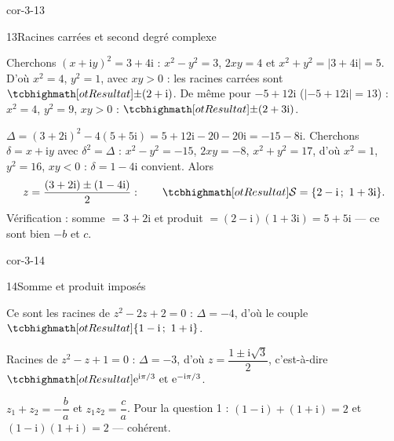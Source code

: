 \begin{blocLivre}{cor-3-13}
\begin{corrige}{13}{Racines carrées et second degré complexe}
\begin{questions}
  \item Cherchons $(x+\mathrm{i}y)^{2}=3+4\mathrm{i}$ :
    $x^{2}-y^{2}=3$, $2xy=4$ et $x^{2}+y^{2}=|3+4\mathrm{i}|=5$. D'où
    $x^{2}=4$, $y^{2}=1$, avec $xy>0$ :
    les racines carrées sont $\res{\pm(2+\mathrm{i})}$.
    De même pour $-5+12\mathrm{i}$ ($|{-5+12\mathrm{i}}|=13$) :
    $x^{2}=4$, $y^{2}=9$, $xy>0$ : $\res{\pm(2+3\mathrm{i})}$.
  \item $\Delta=(3+2\mathrm{i})^{2}-4(5+5\mathrm{i})=5+12\mathrm{i}-20-20\mathrm{i}
    =-15-8\mathrm{i}$. Cherchons $\delta=x+\mathrm{i}y$ avec $\delta^{2}=\Delta$ :
    $x^{2}-y^{2}=-15$, $2xy=-8$, $x^{2}+y^{2}=17$, d'où $x^{2}=1$, $y^{2}=16$,
    $xy<0$ : $\delta=1-4\mathrm{i}$ convient. Alors
    \[
      z=\frac{(3+2\mathrm{i})\pm(1-4\mathrm{i})}{2} :
      \qquad\res{\mathcal{S}=\ens{2-\mathrm{i}\,;\ 1+3\mathrm{i}}}.
    \]
    Vérification : somme $=3+2\mathrm{i}$ et produit
    $=(2-\mathrm{i})(1+3\mathrm{i})=5+5\mathrm{i}$ — ce sont bien $-b$ et $c$.
\end{questions}
\end{corrige}
\end{blocLivre}

\begin{blocLivre}{cor-3-14}
\begin{corrige}{14}{Somme et produit imposés}
\begin{questions}
  \item Ce sont les racines de $z^{2}-2z+2=0$ : $\Delta=-4$, d'où le couple
    $\res{\ens{1-\mathrm{i}\,;\ 1+\mathrm{i}}}$.
  \item Racines de $z^{2}-z+1=0$ : $\Delta=-3$, d'où
    $z=\dfrac{1\pm\mathrm{i}\sqrt3}{2}$, c'est-à-dire
    $\res{\mathrm{e}^{\mathrm{i}\pi/3}\ \text{et}\ \mathrm{e}^{-\mathrm{i}\pi/3}}$.
  \item $z_1+z_2=-\dfrac{b}{a}$ et $z_1z_2=\dfrac{c}{a}$. Pour la question 1 :
    $(1-\mathrm{i})+(1+\mathrm{i})=2$ et $(1-\mathrm{i})(1+\mathrm{i})=2$ — cohérent.
\end{questions}
\end{corrige}
\end{blocLivre}

